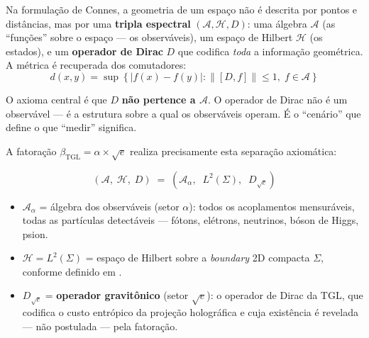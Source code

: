 \documentclass[12pt,a4paper,twoside]{article}
\newcommand{\betatgl}{\beta_{\!\scriptscriptstyle\mathrm{TGL}}}
\newcommand{\boundary}{\textit{boundary}}
\begin{document}
Na formulação de Connes, a geometria de um espaço não é descrita por pontos e distâncias, mas por uma \textbf{tripla espectral} $(\mathcal{A}, \mathcal{H}, D)$: uma álgebra $\mathcal{A}$ (as ``funções'' sobre o espaço --- os observáveis), um espaço de Hilbert $\mathcal{H}$ (os estados), e um \textbf{operador de Dirac} $D$ que codifica \textit{toda} a informação geométrica. A métrica é recuperada dos comutadores:
\begin{equation}
d(x,y) = \sup\left\{|f(x) - f(y)| : \|[D, f]\| \leq 1,\; f \in \mathcal{A}\right\}
\label{eq:connes_distance}
\end{equation}

O axioma central é que $D$ \textbf{não pertence a $\mathcal{A}$}. O operador de Dirac não é um observável --- é a estrutura sobre a qual os observáveis operam. É o ``cenário'' que define o que ``medir'' significa.

A fatoração $\betatgl = \alpha \times \sqrt{e}$ realiza precisamente esta separação axiomática:

\begin{factorbox}[title={Tripla Espectral da TGL}]
\begin{equation}
(\mathcal{A},\; \mathcal{H},\; D) \;=\; \left(\mathcal{A}_\alpha,\;\; L^2(\Sigma),\;\; D_{\sqrt{e}}\right)
\label{eq:tripla}
\end{equation}

\begin{itemize}[nosep]
\item $\mathcal{A}_\alpha$ = álgebra dos observáveis (setor $\alpha$): todos os acoplamentos mensuráveis, todas as partículas detectáveis --- fótons, elétrons, neutrinos, bóson de Higgs, psion.

\item $\mathcal{H} = L^2(\Sigma)$ = espaço de Hilbert sobre a \boundary{} 2D compacta $\Sigma$, conforme definido em \cite{Miguel2026Graviton}.

\item $D_{\sqrt{e}}$ = \textbf{operador gravitônico} (setor $\sqrt{e}$): o operador de Dirac da TGL, que codifica o custo entrópico da projeção holográfica e cuja existência é revelada --- não postulada --- pela fatoração.
\end{itemize}
\end{factorbox}
\end{document}
